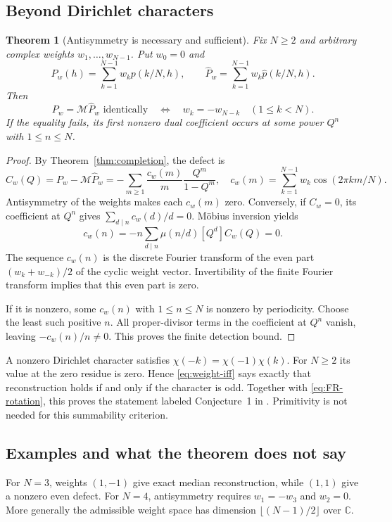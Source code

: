 \documentclass[11pt,a4paper]{article}
\numberwithin{equation}{section}
\newtheorem{theorem}{Theorem}[section]
\theoremstyle{definition}
\theoremstyle{remark}\newtheorem{remark}[theorem]{Remark}
\newcommand{\C}{\mathbb C}\newcommand{\R}{\mathbb R}
\newcommand{\Med}{\mathcal M}\newcommand{\eps}{\varepsilon}
\begin{document}
\subsection{Beyond Dirichlet characters}
\begin{theorem}[Antisymmetry is necessary and sufficient]
\label{thm:weights}
Fix $N\ge2$ and arbitrary complex weights $w_1,\ldots,w_{N-1}$.
Put $w_0=0$ and
\[
 P_w(h)=\sum_{k=1}^{N-1}w_kp(k/N,h),\qquad
 \widehat P_w=\sum_{k=1}^{N-1}w_k\widehat p(k/N,h).
\]
Then
\begin{equation}\label{eq:weight-iff}
 P_w=\Med\widehat P_w\text{ identically}
 \quad\Longleftrightarrow\quad
 w_k=-w_{N-k}\quad(1\le k<N).
\end{equation}
If the equality fails, its first nonzero dual coefficient occurs at some
power $Q^n$ with $1\le n\le N$.
\end{theorem}
\begin{proof}
By Theorem~\ref{thm:completion}, the defect is
\begin{equation}\label{eq:weighted-defect}
 C_w(Q)=P_w-\Med\widehat P_w
  =-\sum_{m\ge1}\frac{c_w(m)}m\frac{Q^m}{1-Q^m},
 \quad c_w(m)=\sum_{k=1}^{N-1}w_k\cos(2\pi km/N).
\end{equation}
Antisymmetry of the weights makes each $c_w(m)$ zero.
Conversely, if $C_w=0$, its coefficient at $Q^n$ gives
$\sum_{d\mid n}c_w(d)/d=0$. M\"obius inversion yields
\begin{equation}\label{eq:mobius-c}
 c_w(n)=-n\sum_{d\mid n}\mu(n/d)[Q^d]C_w(Q)=0.
\end{equation}
The sequence $c_w(n)$ is the discrete Fourier transform of the even
part $(w_k+w_{-k})/2$ of the cyclic weight vector. Invertibility of the
finite Fourier transform implies that this even part is zero.

If it is nonzero, some $c_w(n)$ with $1\le n\le N$ is nonzero by
periodicity. Choose the least such positive $n$. All proper-divisor
terms in the coefficient at $Q^n$ vanish, leaving $-c_w(n)/n\ne0$.
This proves the finite detection bound.
\end{proof}
A nonzero Dirichlet character satisfies $\chi(-k)=\chi(-1)\chi(k)$.
For $N\ge2$ its value at the zero residue is zero. Hence
\eqref{eq:weight-iff} says exactly that reconstruction holds if and only
if the character is odd. Together with \eqref{eq:FR-rotation}, this
proves the statement labeled Conjecture~1 in \cite{fr}. Primitivity is
not needed for this summability criterion.

\subsection{Examples and what the theorem does not say}
For $N=3$, weights $(1,-1)$ give exact median reconstruction, while
$(1,1)$ give a nonzero even defect. For $N=4$, antisymmetry requires
$w_1=-w_3$ and $w_2=0$. More generally the admissible weight space has
dimension $\lfloor(N-1)/2\rfloor$ over $\C$.
\end{document}
